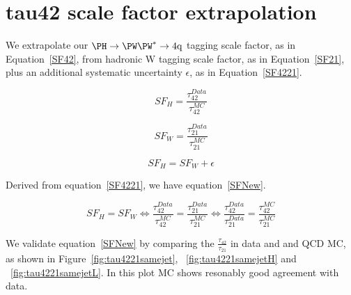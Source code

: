 \section{tau42 scale factor extrapolation}
\label{tau42SF}

We extrapolate our $\Hww$ tagging scale factor, as in Equation~\ref{SF42}, 
 from hadronic W tagging scale factor, as in Equation~\ref{SF21},  plus an additional 
systematic uncertainty $\epsilon$, as in Equation~\ref{SF4221}. 


\begin{equation}
SF_{H} = \frac{\tau_{42}^{Data}}{\tau_{42}^{MC}}
\label{SF42}
\end{equation}

\begin{equation}
SF_{W} = \frac{\tau_{21}^{Data}}{\tau_{21}^{MC}}
\label{SF21}
\end{equation}


\begin{equation}
SF_{H} = SF_{W} + \epsilon
\label{SF4221}
\end{equation}


Derived from equation~\ref{SF4221}, we have equation~\ref{SFNew}.

\begin{equation}
SF_{H} = SF_{W} \Longleftrightarrow \frac{\tau_{42}^{Data}}{\tau_{42}^{MC}} = \frac{\tau_{21}^{Data}}{\tau_{21}^{MC}} \Longleftrightarrow \frac{\tau_{42}^{Data}}{\tau_{21}^{Data}} = \frac{\tau_{42}^{MC}}{\tau_{21}^{MC}}
\label{SFNew}
\end{equation}

We validate equation~\ref{SFNew} by comparing the $\frac{\tau_{42}}{\tau_{21}}$ in data and 
\PYTHIA and \HERWIG QCD MC, as shown in Figure~\ref{fig:tau4221samejet}, ~\ref{fig:tau4221samejetH}
 and ~\ref{fig:tau4221samejetL}. In this plot
MC shows resonably good agreement with data. 
 
